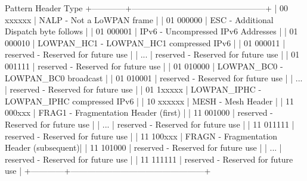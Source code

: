 \begin{DoxyVerb}   Pattern    Header Type
 +------------+------------------------------------------------+
 | 00  xxxxxx | NALP        - Not a LoWPAN frame               |
 | 01  000000 | ESC         - Additional Dispatch byte follows |
 | 01  000001 | IPv6        - Uncompressed IPv6 Addresses      |
 | 01  000010 | LOWPAN_HC1  - LOWPAN_HC1 compressed IPv6       |
 | 01  000011 | reserved    - Reserved for future use          |
 |   ...      | reserved    - Reserved for future use          |
 | 01  001111 | reserved    - Reserved for future use          |
 | 01  010000 | LOWPAN_BC0  - LOWPAN_BC0 broadcast             |
 | 01  010001 | reserved    - Reserved for future use          |
 |   ...      | reserved    - Reserved for future use          |
 | 01  1xxxxx | LOWPAN_IPHC - LOWPAN_IPHC compressed IPv6      |
 | 10  xxxxxx | MESH        - Mesh Header                      |
 | 11  000xxx | FRAG1       - Fragmentation Header (first)     |
 | 11  001000 | reserved    - Reserved for future use          |
 |   ...      | reserved    - Reserved for future use          |
 | 11  011111 | reserved    - Reserved for future use          |
 | 11  100xxx | FRAGN       - Fragmentation Header (subsequent)|
 | 11  101000 | reserved    - Reserved for future use          |
 |   ...      | reserved    - Reserved for future use          |
 | 11  111111 | reserved    - Reserved for future use          |
 +------------+------------------------------------------------+\end{DoxyVerb}
